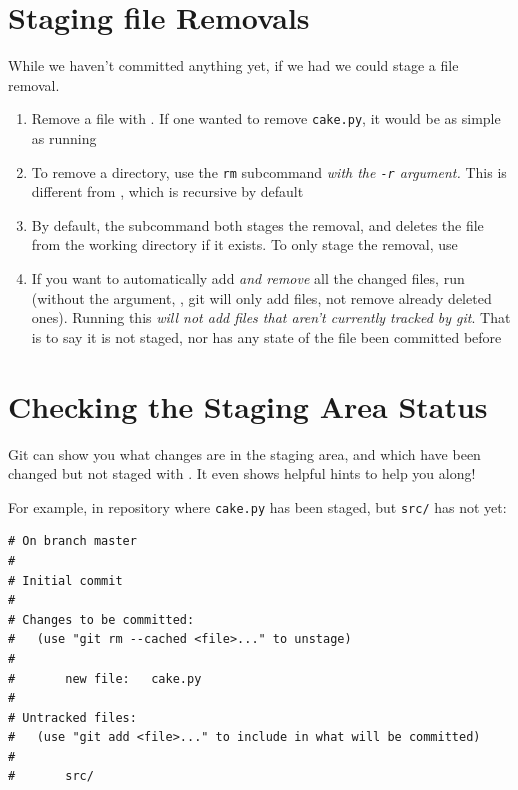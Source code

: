 \documentclass[11pt,letterpaper,twoside]{report}
\begin{document}

\section{Staging file Removals}

While we haven't committed anything yet, if we had we could stage a file
removal.

\begin{enumerate}
\item Remove a file with . If one wanted to remove
    \texttt{cake.py}, it would be as simple as running 
\item To remove a directory, use the \texttt{rm} subcommand \emph{with the
    \texttt{-r} argument.} This is different from , which is
    recursive by default
\item By default, the subcommand both stages the removal, and deletes the file
    from the working directory if it exists. To only stage the removal, use
\item If you want to automatically add \emph{and remove} all the changed files,
    run  (without the  argument,
    , git will only add files, not remove already deleted ones).
    Running this \emph{will not add files that aren't currently tracked by git}.
    That is to say it is not staged, nor has any state of the file been
    committed before
\end{enumerate}

\section{Checking the Staging Area Status}

Git can show you what changes are in the staging area, and which have been
changed but not staged with . It even shows helpful hints to
help you along!

For example, in repository where \texttt{cake.py} has been staged, but
\texttt{src/} has not yet:

\begin{lstlisting}[numbers=none]
# On branch master
#
# Initial commit
#
# Changes to be committed:
#   (use "git rm --cached <file>..." to unstage)
#
#       new file:   cake.py
#
# Untracked files:
#   (use "git add <file>..." to include in what will be committed)
#
#       src/
\end{lstlisting}
\end{document}
